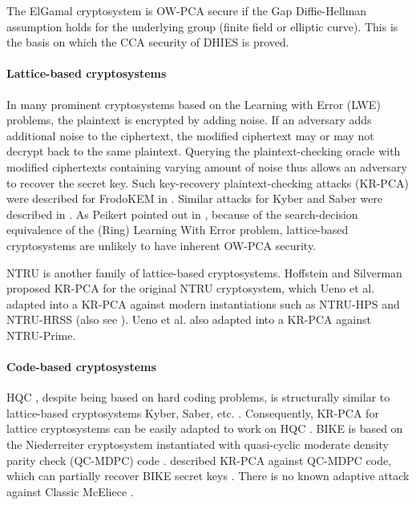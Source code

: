 \documentclass[runningheads]{llncs}
\begin{document}
The ElGamal cryptosystem \cite{DBLP:journals/tit/Elgamal85} is OW-PCA secure if the Gap Diffie-Hellman assumption \cite{DBLP:conf/pkc/OkamotoP01} holds for the underlying group (finite field or elliptic curve). This is the basis on which the CCA security of DHIES \cite{DBLP:conf/ctrsa/AbdallaBR01} is proved.

\paragraph{Lattice-based cryptosystems} In many prominent cryptosystems based on the Learning with Error (LWE) problems, the plaintext is encrypted by adding noise. If an adversary adds additional noise to the ciphertext, the modified ciphertext may or may not decrypt back to the same plaintext. Querying the plaintext-checking oracle with modified ciphertexts containing varying amount of noise thus allows an adversary to recover the secret key. Such key-recovery plaintext-checking attacks (KR-PCA) were described for FrodoKEM in \cite{DBLP:conf/crypto/GuoJN20,DBLP:conf/eurocrypt/BaetuDHTV19}. Similar attacks for Kyber and Saber were described in \cite{DBLP:conf/acns/Huguenin-Dumittan20,DBLP:conf/asiacrypt/XagawaIUTH21,DBLP:conf/pqcrypto/GuoM23}. As Peikert pointed out in \cite{cryptoeprint:2014/070}, because of the search-decision equivalence of the (Ring) Learning With Error problem, lattice-based cryptosystems are unlikely to have inherent OW-PCA security. 

NTRU is another family of lattice-based cryptosystems. Hoffstein and Silverman \cite{hoffstein1999reaction} proposed KR-PCA for the original NTRU cryptosystem, which Ueno et al. \cite{DBLP:journals/tches/UenoXTITH22} adapted into a KR-PCA against modern instantiations such as NTRU-HPS and NTRU-HRSS (also see \cite{cryptoeprint:2021/168}). Ueno et al. also adapted \cite{DBLP:conf/crypto/JaulmesJ00} into a KR-PCA against NTRU-Prime.

\paragraph{Code-based cryptosystems} HQC \cite{hamming-quasi-cyclic-4th-round-submission}, despite being based on hard coding problems, is structurally similar to lattice-based cryptosystems Kyber, Saber, etc. \cite{DBLP:journals/tches/UenoXTITH22}. Consequently, KR-PCA for lattice cryptosystems can be easily adapted to work on HQC \cite{DBLP:conf/acns/Huguenin-Dumittan20,DBLP:conf/eurocrypt/BaetuDHTV19}. BIKE \cite{bike-4th-round-submission} is based on the Niederreiter cryptosystem instantiated with quasi-cyclic moderate density parity check (QC-MDPC) code \cite{DBLP:conf/isit/MisoczkiTSB13}. \cite{DBLP:conf/asiacrypt/Guo0S16} described KR-PCA against QC-MDPC code, which can partially recover BIKE secret keys \cite{DBLP:conf/asiacrypt/XagawaIUTH21}. There is no known adaptive attack against Classic McEliece  \cite{DBLP:journals/tches/UenoXTITH22}.
\end{document}
